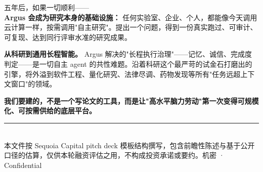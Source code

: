 \documentclass[UTF8,11pt,fontset=none]{ctexart}
\newcommand{\hl}[1]{\textbf{\color{argusnavy}#1}}
\begin{document}
\begin{quotebox}
{\large 五年后，如果一切顺利——\\[4pt]
\textbf{Argus 会成为研究本身的基础设施：} 任何实验室、企业、个人，都能像今天调用云计算一样，按需调用"自主研究"。提出一个问题，得到一份真实跑过、可审计、可复现、达到同行评审水准的研究成果。}
\end{quotebox}

\textbf{从科研到通用长程智能。} Argus 解决的"长程执行治理"——记忆、诚信、完成度判定——是一切自主 agent 的共性难题。沿着科研这个最严苛的试金石打磨出的引擎，将外溢到软件工程、量化研究、法律尽调、药物发现等所有"任务远超上下文窗口"的领域。

\hl{我们要建的，不是一个写论文的工具，而是让"高水平脑力劳动"第一次变得可规模化、可按需供给的底层平台。}

\vspace{1.2em}
{\color{argusline}\rule{\textwidth}{1pt}}\\[0.4em]
{\sffamily\color{argusgray}\small 本文件按 Sequoia Capital pitch deck 模板结构撰写，包含前瞻性陈述与基于公开口径的估算，仅供本轮融资评估之用，不构成投资承诺或要约。\hfill 机密 · Confidential}
\end{document}
